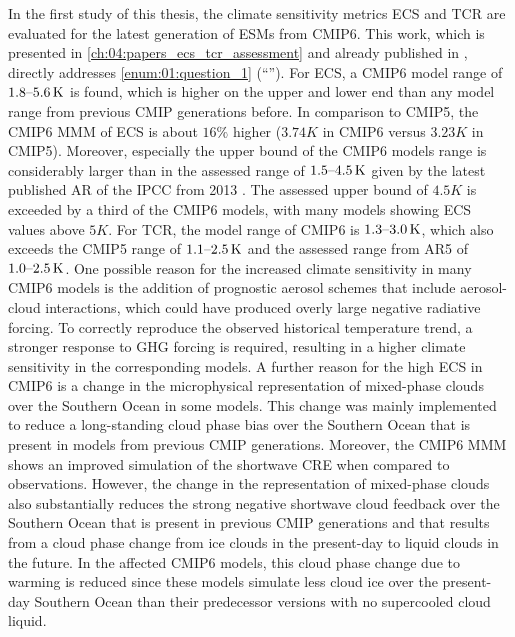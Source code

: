 In the first study of this thesis, the climate sensitivity metrics \ac{ECS} and
\ac{TCR} are evaluated for the latest generation of \acp{ESM} from \acs{CMIP}6.
This work, which is presented in \cref{ch:04:papers_ecs_tcr_assessment} and
already published in \textcite{Bock2020, Meehl2020}, directly addresses
\cref{enum:01:question_1} (\enquote{\emph{\KeyScienceQuestionOne{}}}). For
\ac{ECS}, a \acs{CMIP}6 model range of $\rangeunit{1.8}{5.6}{K}$ is found,
which is higher on the upper and lower end than any model range from previous
\ac{CMIP} generations before. In comparison to \acs{CMIP}5, the \acs{CMIP}6
\ac{MMM} of \ac{ECS} is about $16 \unit{\%}$ higher ($3.74 \unit{K}$ in
\acs{CMIP}6 versus $3.23 \unit{K}$ in \acs{CMIP}5). Moreover, especially the
upper bound of the \acs{CMIP}6 models range is considerably larger than in the
assessed range of $\rangeunit{1.5}{4.5}{K}$ given by the latest published
\ac{AR} of the \ac{IPCC} from 2013 \autocite{Stocker2013}. The assessed upper
bound of $4.5 \unit{K}$ is exceeded by a third of the \acs{CMIP}6 models, with
many models showing \ac{ECS} values above $5 \unit{K}$. For \ac{TCR}, the model
range of \acs{CMIP}6 is $\rangeunit{1.3}{3.0}{K}$, which also exceeds the
\acs{CMIP}5 range of $\rangeunit{1.1}{2.5}{K}$ and the assessed range from
\acs{AR}5 of $\rangeunit{1.0}{2.5}{K}$. One possible reason for the increased
climate sensitivity in many \acs{CMIP}6 models is the addition of prognostic
aerosol schemes that include aerosol-cloud interactions, which could have
produced overly large negative radiative forcing. To correctly reproduce the
observed historical temperature trend, a stronger response to \ac{GHG} forcing
is required, resulting in a higher climate sensitivity in the corresponding
models. A further reason for the high \ac{ECS} in \acs{CMIP}6 is a change in
the microphysical representation of mixed-phase clouds over the Southern Ocean
in some models. This change was mainly implemented to reduce a long-standing
cloud phase bias over the Southern Ocean that is present in models from
previous \ac{CMIP} generations. Moreover, the \acs{CMIP}6 \ac{MMM} shows an
improved simulation of the shortwave \ac{CRE} when compared to observations.
However, the change in the representation of mixed-phase clouds also
substantially reduces the strong negative shortwave cloud feedback over the
Southern Ocean that is present in previous \ac{CMIP} generations and that
results from a cloud phase change from ice clouds in the present-day to liquid
clouds in the future. In the affected \acs{CMIP}6 models, this cloud phase
change due to warming is reduced since these models simulate less cloud ice
over the present-day Southern Ocean than their predecessor versions with no
supercooled cloud liquid.

